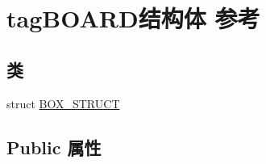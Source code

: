 \hypertarget{structtag_b_o_a_r_d}{}\section{tag\+B\+O\+A\+R\+D结构体 参考}
\label{structtag_b_o_a_r_d}
\subsection*{类}
\begin{DoxyCompactItemize}
\item 
struct \hyperlink{structtag_b_o_a_r_d_1_1_b_o_x___s_t_r_u_c_t}{B\+O\+X\+\_\+\+S\+T\+R\+U\+CT}
\end{DoxyCompactItemize}
\subsection*{Public 属性}
